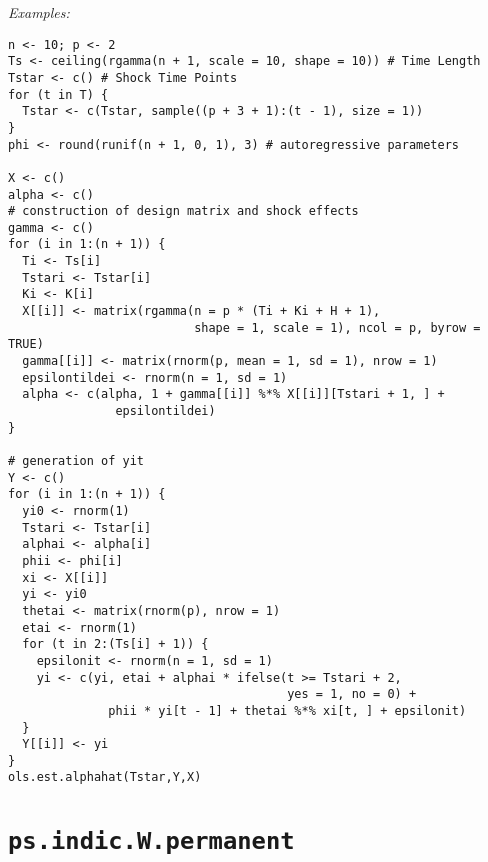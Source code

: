 \documentclass[12pt]{article}
\begin{document}
 \emph{Examples:}
 
 \begin{verbatim}
n <- 10; p <- 2
Ts <- ceiling(rgamma(n + 1, scale = 10, shape = 10)) # Time Length
Tstar <- c() # Shock Time Points
for (t in T) {
  Tstar <- c(Tstar, sample((p + 3 + 1):(t - 1), size = 1))
}
phi <- round(runif(n + 1, 0, 1), 3) # autoregressive parameters

X <- c()
alpha <- c()
# construction of design matrix and shock effects
gamma <- c()
for (i in 1:(n + 1)) {
  Ti <- Ts[i]
  Tstari <- Tstar[i]
  Ki <- K[i]
  X[[i]] <- matrix(rgamma(n = p * (Ti + Ki + H + 1),
                          shape = 1, scale = 1), ncol = p, byrow = TRUE) 
  gamma[[i]] <- matrix(rnorm(p, mean = 1, sd = 1), nrow = 1)
  epsilontildei <- rnorm(n = 1, sd = 1)
  alpha <- c(alpha, 1 + gamma[[i]] %*% X[[i]][Tstari + 1, ] +
               epsilontildei)
}

# generation of yit
Y <- c()
for (i in 1:(n + 1)) {
  yi0 <- rnorm(1)
  Tstari <- Tstar[i]
  alphai <- alpha[i]
  phii <- phi[i]
  xi <- X[[i]]
  yi <- yi0
  thetai <- matrix(rnorm(p), nrow = 1)
  etai <- rnorm(1)
  for (t in 2:(Ts[i] + 1)) {
    epsilonit <- rnorm(n = 1, sd = 1)
    yi <- c(yi, etai + alphai * ifelse(t >= Tstari + 2, 
                                       yes = 1, no = 0) +
              phii * yi[t - 1] + thetai %*% xi[t, ] + epsilonit)
  }
  Y[[i]] <- yi
}
ols.est.alphahat(Tstar,Y,X)
 \end{verbatim}
 
 
 
 \section{\texttt{ps.indic.W.permanent}}
 
\end{document}
